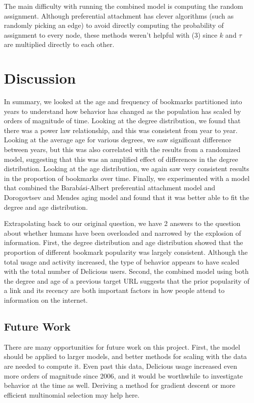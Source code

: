 \documentclass[11pt]{amsart}
\begin{document}
The main difficulty with running the combined model is computing the random assignment. Although preferential attachment has clever algorithms (such as randomly picking an edge) to avoid directly computing the probability of assignment to every node, these methods weren't helpful with (3) since $k$ and $\tau$ are multiplied directly to each other. 

\section{Discussion}
In summary, we looked at the age and frequency of bookmarks partitioned into years to understand how behavior has changed as the population has scaled by orders of magnitude of time. Looking at the degree distribution, we found that there was a power law relationship, and this was consistent from year to year. Looking at the average age for various degrees, we saw significant difference between years, but this was also correlated with the results from a randomized model, suggesting that this was an amplified effect of differences in the degree distribution. Looking at the age distribution, we again saw very consistent results in the proportion of bookmarks over time. Finally, we experimented with a model that combined the Barab\'{a}si-Albert preferential attachment model \cite{barabasi} and Dorogovtsev and Mendes aging model \cite{aging} and found that it was better able to fit the degree and age distribution.

Extrapolating back to our original question, we have 2 answers to the question about whether humans have been overloaded and narrowed by the explosion of information. First, the degree distribution and age distribution showed that the proportion of different bookmark popularity was largely consistent. Although the total usage and activity increased, the type of behavior appears to have scaled with the total number of Delicious users. Second, the combined model using both the degree and age of a previous target URL suggests that the prior popularity of a link and its recency are both important factors in how people attend to information on the internet.

\subsection{Future Work}

There are many opportunities for future work on this project. First, the model should be applied to larger models, and better methods for scaling with the data are needed to compute it. Even past this data, Delicious usage increased even more orders of magnitude since 2006, and it would be worthwhile to investigate behavior at the time as well. Deriving a method for gradient descent or more efficient multinomial selection may help here.
\end{document}
